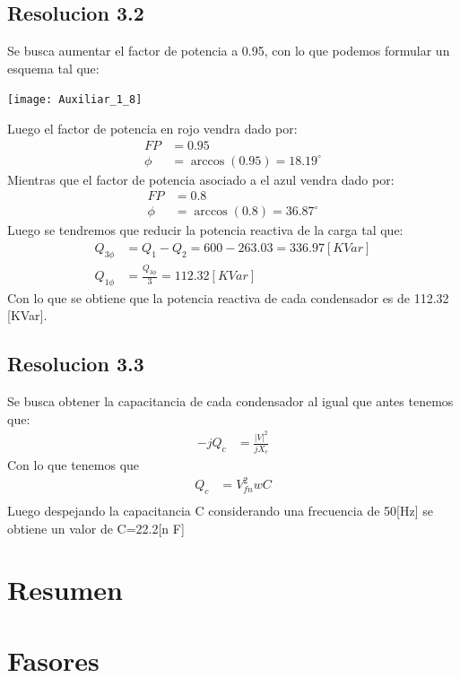 \documentclass[
  11pt,
  letterpaper,
   addpoints,
  ]{exam}
\begin{document}
\begin{questions}
\begin{solution}
\subsection*{Resolucion 3.2}
Se busca aumentar el factor de potencia a 0.95, con lo que podemos formular un esquema tal que:
\begin{center}
    \texttt{[image: Auxiliar\_1\_8]}
  \end{center}
Luego el factor de potencia en rojo vendra dado por:
\begin{align}
    FP&= 0.95\\
    \phi &= \arccos(0.95) = 18.19^{\circ}
\end{align}
Mientras que el factor de potencia asociado a el azul vendra dado por:
\begin{align}
    FP &= 0.8 \\
    \phi &= \arccos(0.8) = 36.87^\circ
\end{align}
Luego se tendremos que reducir la potencia reactiva de la carga tal que:
\begin{align}
    Q_{3\phi} &= Q_{1} - Q_{2} = 600 - 263.03 = 336.97 [KVar]\\
    Q_{1\phi} &= \frac{Q_{3\phi}}{3} = 112.32 [KVar]
\end{align}
Con lo que se obtiene que la potencia reactiva de cada condensador es de 112.32 [KVar].
\subsection*{Resolucion 3.3}
Se busca obtener la capacitancia de cada condensador al igual que antes tenemos que:
\begin{align}
    -jQ_{c} &= \frac{|V|^{2}}{jX_{c}}
\end{align}
Con lo que tenemos que 
\begin{align}
    Q_{c} &= V_{fn}^{2}wC\\
\end{align}
Luego despejando la capacitancia C considerando una frecuencia de 50[Hz] se obtiene un valor de C=22.2[n F]
\end{solution}

\end{questions}
\newpage
\section{Resumen}

\section*{Fasores}
\end{document}
